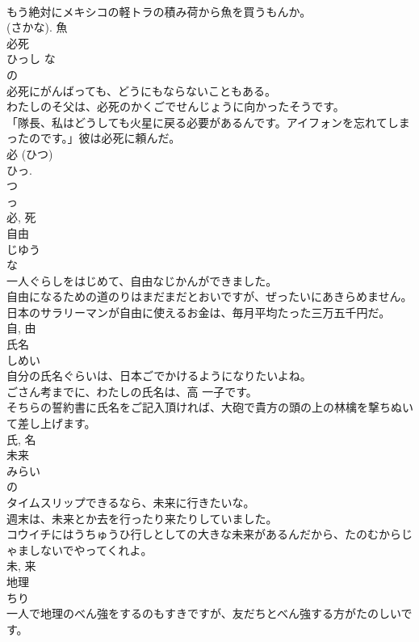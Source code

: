 \documentclass[8pt]{extreport}
\begin{document}
\begin{CJK}{UTF8}{min}
\\	もう絶対にメキシコの軽トラの積み荷から魚を買うもんか。	
\\	(さかな).	魚	
\\	必死	
\\	ひっし	な 
\\	の 
\\	必死にがんばっても、どうにもならないこともある。	
\\	わたしのそ父は、必死のかくごでせんじょうに向かったそうです。	
\\	「隊長、私はどうしても火星に戻る必要があるんです。アイフォンを忘れてしまったのです。」彼は必死に頼んだ。	
\\	必 (ひつ) 
\\	ひっ. 
\\	つ 
\\	っ 
\\	必, 死	
\\	自由	
\\	じゆう	
\\	な 
\\	一人ぐらしをはじめて、自由なじかんができました。	
\\	自由になるための道のりはまだまだとおいですが、ぜったいにあきらめません。	
\\	日本のサラリーマンが自由に使えるお金は、毎月平均たった三万五千円だ。	
\\	自, 由	
\\	氏名	
\\	しめい	
\\	自分の氏名ぐらいは、日本ごでかけるようになりたいよね。	
\\	ごさん考までに、わたしの氏名は、高 一子です。	
\\	そちらの誓約書に氏名をご記入頂ければ、大砲で貴方の頭の上の林檎を撃ちぬいて差し上げます。	
\\	氏, 名	
\\	未来	
\\	みらい	
\\	の 
\\	タイムスリップできるなら、未来に行きたいな。	
\\	週末は、未来とか去を行ったり来たりしていました。	
\\	コウイチにはうちゅうひ行しとしての大きな未来があるんだから、たのむからじゃましないでやってくれよ。	
\\	未, 来	
\\	地理	
\\	ちり	
\\	一人で地理のべん強をするのもすきですが、友だちとべん強する方がたのしいです。	

\end{CJK}
\end{document}
